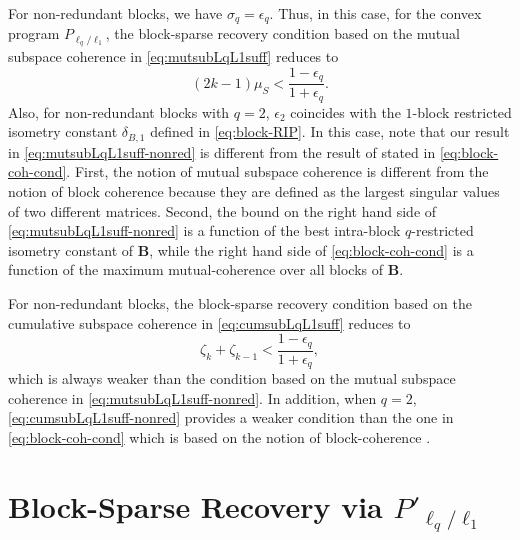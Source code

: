 \documentclass[10pt,twocolumn,twoside] {IEEEtran}
\begin{document}
{For non-redundant blocks, we have $\sigma_q = \epsilon_q$. Thus, in this case, for the convex program $P_{\ell_q/\ell_1}$, the block-sparse recovery condition based on the mutual subspace coherence in \eqref{eq:mutsubLqL1suff} reduces to
\begin{equation}
\label{eq:mutsubLqL1suff-nonred}
(2 k - 1) \mu_S < \frac{1-\epsilon_q}{1+\epsilon_q}.
\end{equation}
Also, for non-redundant blocks with $q=2$, $\epsilon_2$ coincides with the $1$-block restricted isometry constant $\delta_{B,1}$ defined in \eqref{eq:block-RIP}. In this case, note that our result in \eqref{eq:mutsubLqL1suff-nonred} is different from the result of \cite{Eldar:TSP10} stated in \eqref{eq:block-coh-cond}. First, the notion of mutual subspace coherence is different from the notion of block coherence because they are defined as the largest singular values of two different matrices. Second, the bound on the right hand side of \eqref{eq:mutsubLqL1suff-nonred} is a function of the best intra-block $q$-restricted isometry constant of ${\boldsymbol{B}}$, while the right hand side of \eqref{eq:block-coh-cond} is a function of the maximum mutual-coherence over all blocks of ${\boldsymbol{B}}$. 

For non-redundant blocks, the block-sparse recovery condition based on the cumulative subspace coherence in \eqref{eq:cumsubLqL1suff} reduces to
\begin{equation}
\label{eq:cumsubLqL1suff-nonred}
\zeta_k + \zeta_{k-1} < \frac{1-\epsilon_q}{1+\epsilon_q},
\end{equation}
which is always weaker than the condition based on the mutual subspace coherence in \eqref{eq:mutsubLqL1suff-nonred}. In addition, when $q=2$, \eqref{eq:cumsubLqL1suff-nonred} provides a weaker condition than the one in \eqref{eq:block-coh-cond} which is based on the notion of block-coherence \cite{Eldar:TSP10}.

\section{Block-Sparse Recovery via $P'_{\ell_q/\ell_1}$}
\label{sec:L2L1P}

}
\end{document}
